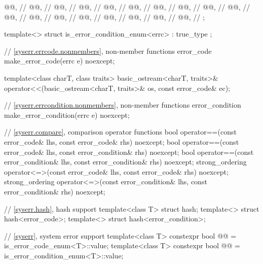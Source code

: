 \begin{codeblock}
{{    @@,              // 
    @@,                         // 
    @@,                  // 
    @@,                     // 
    @@,             // 
    @@,              // 
    @@,      // 
    @@,     // 
    @@,                // 
    @@,              // 
    @@,                     // 
    @@,                          // 
    @@,      // 
    @@,                // 
    @@,                     // 
    @@,      // 
    @@,                    // 
    @@,                // 
  };

  template<> struct is_error_condition_enum<errc> : true_type {};

  // \ref{syserr.errcode.nonmembers}, non-member functions
  error_code make_error_code(errc e) noexcept;

  template<class charT, class traits>
    basic_ostream<charT, traits>&
      operator<<(basic_ostream<charT, traits>& os, const error_code& ec);

  // \ref{syserr.errcondition.nonmembers}, non-member functions
  error_condition make_error_condition(errc e) noexcept;

  // \ref{syserr.compare}, comparison operator functions
  bool operator==(const error_code& lhs, const error_code& rhs) noexcept;
  bool operator==(const error_code& lhs, const error_condition& rhs) noexcept;
  bool operator==(const error_condition& lhs, const error_condition& rhs) noexcept;
  strong_ordering operator<=>(const error_code& lhs, const error_code& rhs) noexcept;
  strong_ordering operator<=>(const error_condition& lhs, const error_condition& rhs) noexcept;

  // \ref{syserr.hash}, hash support
  template<class T> struct hash;
  template<> struct hash<error_code>;
  template<> struct hash<error_condition>;

  // \ref{syserr}, system error support
  template<class T>
    constexpr bool @@ = is_error_code_enum<T>::value;
  template<class T>
    constexpr bool @@ = is_error_condition_enum<T>::value;
}
\end{codeblock}

